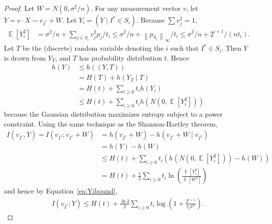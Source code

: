 \documentclass[twoside,leqno,twocolumn]{article}
\newcommand{\norm}[2]{\left \lVert#2\right \rVert_{#1}}
\DeclareMathOperator*{\E}{\mathbb{E}}
\begin{document}
\begin{proof}
  Let $W = N(0, \sigma^2/n)$.  For any measurement vector $v$, let $Y
  = v \cdot X \sim v_{I^*} + W$.  Let $Y_i = (Y \mid I^* \in S_i)$.
  Because $\sum v_j^2 = 1$,
  \begin{align}\label{eq:Yibound}
    \E[Y_i^2] &= \sigma^2/n + \sum_{j \in S_i} v_j^2 p_j/t_i 
\leq
    \sigma^2/n + \norm{\infty}{p_{S_i}}/t_i \leq \sigma^2/n +
    2^{i+1}/(nt_i).
  \end{align}
  Let $T$ be the (discrete) random variable denoting the $i$ such that
  $I^* \in S_i$.  Then $Y$ is drawn from $Y_T$, and $T$ has
  probability distribution $t$.  Hence
  \begin{align*}
    h(Y) &\leq h((Y, T))\\
    &= H(T) + h(Y_T \mid T)\\
    &= H(t) + \sum_{i \geq 0} t_i h(Y_i)\\
    &\leq H(t) + \sum_{i \geq 0} t_i h(N(0, \E[Y_i^2]))
  \end{align*}
  because the Gaussian distribution maximizes entropy subject to a
  power constraint.  Using the same technique as the Shannon-Hartley
  theorem,
  \begin{align*}
    I(v_{I^*}, Y)
= I(v_{I^*}; v_{I^*} + W) 
&= h(v_{I^*} + W) - h(v_{I^*}+W \mid v_{I^*})\\
    &= h(Y) - h(W)\\
    &\leq H(t) + \sum_{i \geq 0} t_i (h(N(0, \E[Y_i^2])) - h(W))\\
    &= H(t) + \frac{1}{2}\sum_{i \geq 0} t_i \ln(\frac{\E[Y_i^2]}{\E[W^2]})
  \end{align*}
  and hence by Equation~\eqref{eq:Yibound},
  \begin{align}\label{eq:Iint_i}
    I(v_{I^*}; Y) \leq H(t) + \frac{\ln 2}{2}\sum_{i \geq 0} t_i \log(1 + \frac{2^{i+1}}{t_i\sigma^2}).
  \end{align}


\end{proof}
\end{document}

